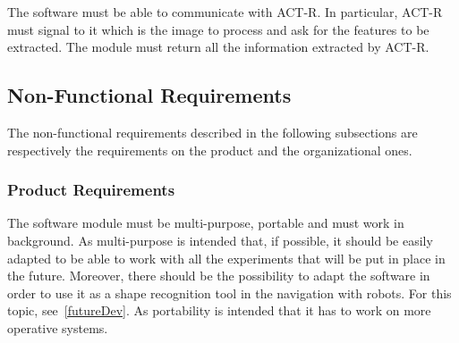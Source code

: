 		The software must be able to communicate with ACT-R. 
		In particular, ACT-R must signal to it which is the image to process and ask for the features to be extracted. The module must return all the information extracted by ACT-R.

		\subsection{Non-Functional Requirements}
		The non-functional requirements described in the following subsections are respectively the requirements on the product and the organizational ones.

			\subsubsection{Product Requirements}
			The software module must be multi-purpose, portable and must work in background.
			As multi-purpose is intended that, if possible, it should be easily adapted to be able to work with all the experiments that will be put in place in the future. Moreover, there should be the possibility to adapt the software in order to use it as a shape recognition tool in the navigation with robots. For this topic, see~\ref{futureDev}. 
			As portability is intended that it has to work on more operative systems.
	
